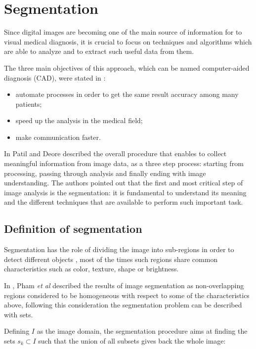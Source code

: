 \documentclass[../main.tex]{subfiles}
\begin{document}
\section{Segmentation}

Since digital images are becoming one of the main source of information for to visual medical diagnosis, it is crucial to focus on techniques and algorithms which are able to analyze and to extract such useful data from them.

The three main objectives of this approach, which can be named computer-aided diagnosis (CAD), were stated in \cite{automated_segm_tech}:
\begin{itemize}
    \item automate processes in order to get the same result accuracy among many patients;
    \item speed up the analysis in the medical field;
    \item make communication faster.
\end{itemize}

In \cite{segmentation_review_1} Patil and Deore  described the overall procedure that enables to collect meaningful information from image data, as a three step process: starting from processing, passing through analysis and finally ending with image understanding. The authors pointed out that the first and most critical step of image analysis is the segmentation: it is fundamental to understand its meaning and the different techniques that are available to perform such important task.

\subsection{Definition of segmentation}

Segmentation has the role of dividing the image into sub-regions in order to detect different objects \cite{automated_segm_tech}, most of the times such regions share common characteristics such as color, texture, shape or brightness.

In \cite{sgmentation_1_survey}, Pham \textit{et al} described the results of image segmentation as non-overlapping regions considered to be homogeneous with respect to some of the characteristics above, following this consideration the segmentation problem can be described with sets.

Defining $I$ as the image domain, the segmentation procedure aims at finding the sets $s_{k}\subset I$ such that the union of all subsets gives back the whole image:
\end{document}
